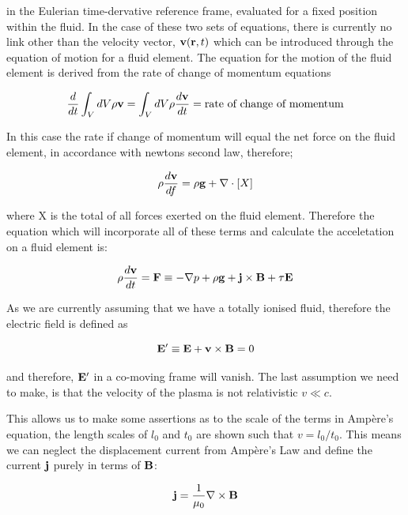 \noindent in the Eulerian time-dervative reference frame, evaluated for a fixed position within the fluid.
In the case of these two sets of equations, there is currently no link other than the velocity vector, $\mathbf{v}(\mathbf{r},t)$ which can be introduced through the equation of motion for a fluid element.
The equation for the motion of the fluid element is derived from the rate of change of momentum equations 

\begin{equation}
	\frac{d}{dt} \int_{V}^{}dV\rho\mathbf{v} = \int_{V}^{}dV\rho\frac{d \mathbf{v}}{d t } = \textnormal{rate of change of momentum}
\end{equation}

\noindent In this case the rate if change of momentum will equal the net force on the fluid element, in accordance with newtons second law, therefore;

\begin{equation}
	\rho \frac{d \mathbf{v}}{d f } = \rho\mathbf{g} + \nabla\cdot[X]
\end{equation}

\noindent where X is the total of all forces exerted on the fluid element. 
Therefore the equation which will incorporate all of these terms and calculate the acceletation on a fluid element is:

\begin{equation}
	\rho \frac{d \mathbf{v}}{d t } = \mathbf{F} \equiv -\nabla p + \rho\mathbf{g} + \mathbf{j} \times \mathbf{B + \tau\mathbf{E}} 
\end{equation}

\noindent As we are currently assuming that we have a totally ionised fluid, therefore the electric field is defined as

\begin{equation}
	\mathbf{E}' \equiv \mathbf{E} + \mathbf{v} \times \mathbf{B} = 0
\end{equation}

\noindent and therefore, $\mathbf{E}'$ in a co-moving frame will vanish.
The last assumption we need to make, is that the velocity of the plasma is not relativistic $v \ll c$.

This allows us to make some assertions as to the scale of the terms in Amp{\`e}re's equation, the length scales of $l_0$ and $t_0$ are shown such that $v = l_0/t_0$.
This means we can neglect the displacement current from Amp{\`e}re's Law and define the current $\mathbf{j}$ purely in terms of $\mathbf{B}$:

\begin{equation}
	\mathbf{j} = \frac{1}{\mu_0}\nabla \times \mathbf{B}
\end{equation}


